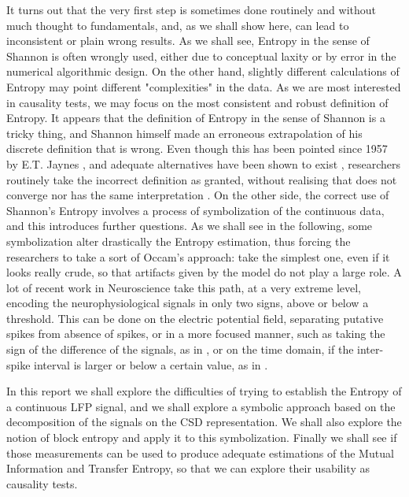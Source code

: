 \documentclass{article}
\begin{document}
It turns out that the very first step is sometimes done routinely and without much thought to fundamentals, and, as we shall show here, can lead to inconsistent or plain wrong results. As we shall see, Entropy in the sense of Shannon is often wrongly used, either due to conceptual laxity or by error in the numerical algorithmic design. On the other hand, slightly different calculations of Entropy may point different "complexities" in the data. As we are most interested in causality tests, we may focus on the most consistent and robust definition of Entropy. It appears that the definition of Entropy in the sense of Shannon is a tricky thing, and Shannon himself made an erroneous extrapolation of his discrete definition that is wrong. Even though this has been pointed since 1957 by E.T. Jaynes \cite{Jaynes1957}, and adequate alternatives have been shown to exist
\cite{Kullback1951, Schroeder2004}, researchers routinely take the incorrect definition as granted, without realising that does not converge nor has the same interpretation \cite{Jaynes1968}. On the other side, the correct use of Shannon's Entropy involves
a process of symbolization of the continuous data, and this introduces further
questions. As we shall see in the following, some symbolization alter drastically
the Entropy estimation, thus forcing the researchers to take a sort of Occam's approach:
take the simplest one, even if it looks really crude, so that artifacts given
by the model do not play a large role. A lot of recent work in Neuroscience take this
path, at a very extreme level, encoding the neurophysiological signals in
only two signs, above or below a threshold. This can be done on the electric potential field, separating putative spikes from absence of spikes, or in a  more
focused manner, such as taking the sign of
the difference of the signals, as in \cite{Steuer2004}, or on
the time domain, if the inter-spike interval is larger or below a certain value,
as in \cite{Steuer2001}.

In this report we shall explore the difficulties of trying to establish the
Entropy of a continuous LFP signal, and we shall explore a symbolic approach based
on the decomposition of the signals on the CSD representation. We shall also explore
the notion of block entropy and apply it to this symbolization. Finally we shall
see if those measurements can be used to produce adequate estimations of the
Mutual Information and Transfer Entropy, so that we can explore their
usability as causality tests.
\end{document}
